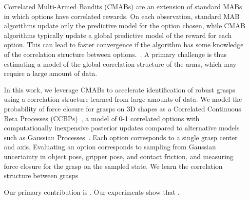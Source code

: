 Correlated Multi-Armed Bandits (CMABs) are an extension of standard MABs in which options have correlated rewards.
On each observation, standard MAB algorithms update only the predictive model for the option chosen, while CMAB algorithms typically update a global predictive model of the reward for each option.
This can lead to faster convergence if the algorithm has some knowledge of the correlation structure between options.~\cite{}.
A primary challenge is thus estimating a model of the global correlation structure of the arms, which may require a large amount of data.

In this work, we leverage CMABs to accelerate identification of robust grasps using a correlation structure learned from large amounts of data.
We model the probability of force closure for grasps on 3D shapes as a Correlated Continuous Beta Processes (CCBPs)~\cite{}, a model of 0-1 correlated options with computationally inexpensive posterior updates compared to alternative models such as Gaussian Processes~\cite{}.
Each option corresponds to a single grasp center and axis.
Evaluating an option corresponds to sampling from Gaussian uncertainty in object pose, gripper pose, and contact friction, and measuring force closure for the grasp on the sampled state.
We learn the correlation structure between grasps 

Our primary contribution is .
Our experiments show that .


 





